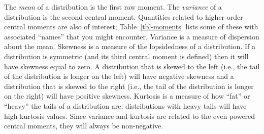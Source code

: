 \documentclass[
  a4paper,
  DIV=11,
  numbers=noendperiod,
  oneside]{scrreprt}
\theoremstyle{definition}
\theoremstyle{definition}
\theoremstyle{plain}
\theoremstyle{plain}
\theoremstyle{definition}
\theoremstyle{remark}
\begin{document}
The \emph{mean} of a distribution is the first raw moment. The
\emph{variance} of a distribution is the second central moment.
Quantities related to higher order central moments are also of interest;
Table~\ref{tbl-moments} lists some of these with associated ``names''
that you might encounter. Variance is a measure of dispersion about the
mean. Skewness is a measure of the lopsidedness of a distribution. If a
distribution is symmetric (and its third central moment is defined) then
it will have skewness equal to zero. A distribution that is skewed to
the left (i.e., the tail of the distribution is longer on the left) will
have negative skewness and a distribution that is skewed to the right
(i.e., the tail of the distribution is longer on the right) will have
positive skewness. Kurtosis is a measure of how ``fat'' or ``heavy'' the
tails of a distribution are; distributions with heavy tails will have
high kurtosis values. Since variance and kurtosis are related to the
even-powered central moments, they will always be non-negative.

\begin{table}

\caption{\label{tbl-moments}First few moments for a rv \(X\) with mean
\(\mu = \mathbf{E}[X]\).}

\begin{minipage}{0.50\linewidth}



\end{minipage}%
%
\begin{minipage}{0.50\linewidth}



\end{minipage}%

\end{table}%
\end{document}
